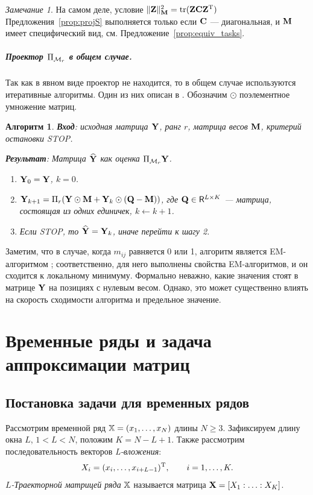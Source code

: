 \documentclass[12pt, specialist, subf,href,colorlinks=true,substylefile = spbu.rtx]{disser}
\DeclareMathOperator{\tr}{tr}
\newtheorem{algorithm}{Алгоритм}
\theoremstyle{remark}
\newtheorem{remark}{Замечание}
\theoremstyle{definition}
\begin{document}
\begin{remark}
	\label{rem:diagC}
	На самом деле, условие $\|\bfZ\|_\bfM^2 = \tr(\bfZ \bfC \bfZ^\rmT)$ Предложения~\ref{prop:projS} выполняется только если $\mathbf{C}$ --- диагональная, и $\mathbf{M}$ имеет специфический вид, см. Предложение~\ref{prop:equiv_tasks}.
\end{remark}

\paragraph{Проектор $\Pi_{\mathcal{M}_r}$ в общем случае.}
Так как в явном виде проектор не находится, то в общем случае используются итеративные алгоритмы.
Один из них описан в \cite{Srebro2003}. Обозначим $\odot$ поэлементное умножение матриц.

\begin{algorithm}
\label{alg:weightedSVD}
\textbf{Вход}: исходная матрица $\mathbf{Y}$, ранг $r$, матрица весов $\mathbf{M}$,
критерий остановки STOP.

\textbf{Результат}:
Матрица $\widehat{\mathbf{Y}}$ как оценка $\Pi_{\mathcal{M}_r} \mathbf{Y}$.

\begin{enumerate}
\item
$\mathbf{Y}_0 = \mathbf{Y}$, $k=0$.
\item
$\mathbf{Y}_{k+1} = \Pi_r(\mathbf{Y} \odot \mathbf{M} + \mathbf{Y}_{k} \odot (\mathbf{Q} -  \mathbf{M}))$, где
$\mathbf{Q} \in \mathsf{R}^{L \times K}$ --- матрица, состоящая из одних единичек, $k\leftarrow k+1$.
\item
Если STOP, то $\widehat{\mathbf{Y}} = \mathbf{Y}_k$, иначе перейти к шагу 2.
\end{enumerate}
\end{algorithm}

Заметим, что в случае, когда $m_{ij}$ равняется 0 или 1, алгоритм является EM-алгоритмом \cite{Srebro2003};
соответственно, для него выполнены свойства EM-алгоритмов, и он сходится к локальному минимуму.
Формально неважно, какие значения стоят в матрице $\mathbf{Y}$ на позициях с нулевым весом. Однако, это может существенно влиять на скорость сходимости алгоритма и предельное значение.

\chapter{Временные ряды и задача аппроксимации матриц}
\label{sec:ts_matrices}
\section{Постановка задачи для временных рядов}
\label{sec:ts}
Рассмотрим временной ряд $\mathbb{X} = (x_1, \ldots, x_N)$ длины $N \ge 3$. Зафиксируем длину окна $L$, $1 < L < N$, положим $K = N - L + 1$. Также рассмотрим последовательность векторов \emph{L-вложения}:
\begin{equation}\label{l_lagged}
X_i = (x_i, \ldots, x_{i + L - 1})^{\mathrm{T}}, \qquad i = 1, \ldots, K.
\end{equation}
\emph{$L$-Траекторной матрицей ряда} $\mathbb{X}$ называется матрица $\mathbf{X} = [X_1:\ldots:X_K]$.
\end{document}
